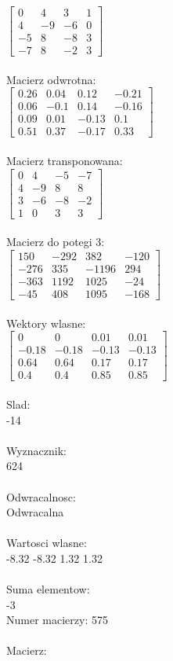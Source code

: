 \documentclass[a4paper,12pt]{article}
\begin{document}
$\begin{bmatrix} 0&4&3&1\\4&-9&-6&0\\-5&8&-8&3\\-7&8&-2&3 \end{bmatrix}$
\\
\\
Macierz odwrotna:\\

$\begin{bmatrix} 0.26&0.04&0.12&-0.21\\0.06&-0.1&0.14&-0.16\\0.09&0.01&-0.13&0.1\\0.51&0.37&-0.17&0.33 \end{bmatrix}$
\\
\\
Macierz transponowana:\\

$\begin{bmatrix} 0&4&-5&-7\\4&-9&8&8\\3&-6&-8&-2\\1&0&3&3 \end{bmatrix}$
\\
\\
Macierz do potegi 3:\\

$\begin{bmatrix} 150&-292&382&-120\\-276&335&-1196&294\\-363&1192&1025&-24\\-45&408&1095&-168 \end{bmatrix}$
\\
\\
Wektory wlasne:\\

$\begin{bmatrix} 0&0&0.01&0.01\\-0.18&-0.18&-0.13&-0.13\\0.64&0.64&0.17&0.17\\0.4&0.4&0.85&0.85 \end{bmatrix}$
\\
\\
Slad:\\
-14
\\
\\
Wyznacznik:\\
624
\\
\\
Odwracalnosc:\\
Odwracalna
\\
\\
Wartosci wlasne:\\
-8.32 -8.32 1.32 1.32
\\
\\
Suma elementow:\\
-3
\\
\newpage
Numer macierzy:
575
\\
\\
Macierz:\\
\end{document}
